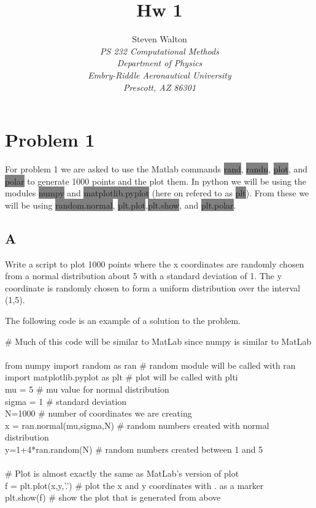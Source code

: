 \documentclass[11pt]{article}   %
\title{Hw 1}
\author{Steven Walton\\     %
\textit{PS 232 Computational Methods}\\
\textit{Department of Physics}\\
\textit{Embry-Riddle Aeronautical University}\\
\textit{Prescott, AZ   86301}}
\newcommand{\gray}[1]{\colorbox{gray}{#1}}
\begin{document}
\maketitle

\section*{Problem 1}
For problem 1 we are asked to use the Matlab commands \gray{rand}, \gray{randn}, \gray{plot}, and \gray{polar} to generate 1000 points and the plot them.
In python we will be using the modules \gray{numpy} and \gray{matplotlib.pyplot} (here on refered to as \gray{plt}).  From these we will be using \gray{random.normal}, \gray{plt.plot},\gray{plt.show}, and \gray{plt.polar}. 
\subsection*{A}
Write a script to plot 1000 points where the x coordinates are randomly chosen from a normal distribution about 5 with a standard deviation of 1.  The y coordinate is randomly chosen to form a uniform distribution over the interval (1,5).


The following code is an example of a solution to the problem.

\begin{tcolorbox} 
   
   \noindent
      $\#$ Much of this code will be similar to MatLab since numpy is similar to MatLab\\
      \\
      from numpy import random as ran $\#$ random module will be called with ran\\
      import matplotlib.pyplot as plt $\#$ plot will be called with plti\\
      mu = 5                     $\#$ mu value for normal distribution\\
      sigma = 1                  $\#$ standard deviation\\
      N=1000                     $\#$ number of coordinates we are creating\\
      x = ran.normal(mu,sigma,N) $\#$ random numbers created with normal distribution\\ 
      y=1+4*ran.random(N)        $\#$ random numbers created between 1 and 5\\
      \\
      $\#$ Plot is almost exactly the same as MatLab's version of plot\\
      f = plt.plot(x,y,'.')      $\#$ plot the x and y coordinates with . as a marker\\
      plt.show(f)                $\#$ show the plot that is generated from above\\
   
\end{tcolorbox}
\end{document}
